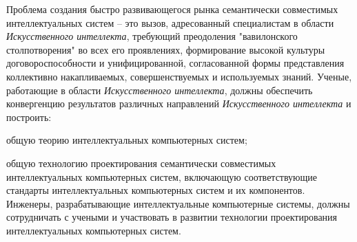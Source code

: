 {Проблема создания быстро развивающегося рынка семантически совместимых интеллектуальных систем – это вызов, адресованный специалистам в области \textit{Искусственного интеллекта}, требующий преодоления "вавилонского столпотворения"{} во всех его проявлениях, формирование высокой культуры договороспособности и унифицированной, согласованной формы представления коллективно накапливаемых, совершенствуемых и используемых знаний.
Ученые, работающие в области \textit{Искусственного интеллекта}, должны обеспечить конвергенцию результатов различных направлений \textit{Искусственного интеллекта} и построить: 
\begin{scnitemize}
\item общую теорию интеллектуальных компьютерных систем; 
\item общую технологию проектирования семантически совместимых интеллектуальных компьютерных систем, включающую соответствующие стандарты интеллектуальных компьютерных систем и их компонентов. Инженеры, разрабатывающие интеллектуальные компьютерные системы, должны сотрудничать с учеными и участвовать в развитии технологии проектирования интеллектуальных компьютерных систем.
\end{scnitemize}
}




